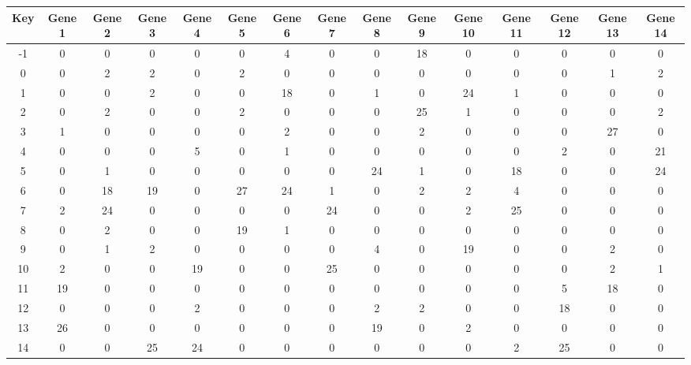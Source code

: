 \begin{tabular}{|c|c|c|c|c|c|c|c|c|c|c|c|c|c|c|}
\hline
Key & Gene 1 & Gene 2 & Gene 3 & Gene 4 & Gene 5 & Gene 6 & Gene 7 & Gene 8 & Gene 9 & Gene 10 & Gene 11 & Gene 12 & Gene 13 & Gene 14 \\
\hline
-1 & 0 & 0 & 0 & 0 & 0 & 4 & 0 & 0 & 18 & 0 & 0 & 0 & 0 & 0 \\
0 & 0 & 2 & 2 & 0 & 2 & 0 & 0 & 0 & 0 & 0 & 0 & 0 & 1 & 2 \\
1 & 0 & 0 & 2 & 0 & 0 & 18 & 0 & 1 & 0 & 24 & 1 & 0 & 0 & 0 \\
2 & 0 & 2 & 0 & 0 & 2 & 0 & 0 & 0 & 25 & 1 & 0 & 0 & 0 & 2 \\
3 & 1 & 0 & 0 & 0 & 0 & 2 & 0 & 0 & 2 & 0 & 0 & 0 & 27 & 0 \\
4 & 0 & 0 & 0 & 5 & 0 & 1 & 0 & 0 & 0 & 0 & 0 & 2 & 0 & 21 \\
5 & 0 & 1 & 0 & 0 & 0 & 0 & 0 & 24 & 1 & 0 & 18 & 0 & 0 & 24 \\
6 & 0 & 18 & 19 & 0 & 27 & 24 & 1 & 0 & 2 & 2 & 4 & 0 & 0 & 0 \\
7 & 2 & 24 & 0 & 0 & 0 & 0 & 24 & 0 & 0 & 2 & 25 & 0 & 0 & 0 \\
8 & 0 & 2 & 0 & 0 & 19 & 1 & 0 & 0 & 0 & 0 & 0 & 0 & 0 & 0 \\
9 & 0 & 1 & 2 & 0 & 0 & 0 & 0 & 4 & 0 & 19 & 0 & 0 & 2 & 0 \\
10 & 2 & 0 & 0 & 19 & 0 & 0 & 25 & 0 & 0 & 0 & 0 & 0 & 2 & 1 \\
11 & 19 & 0 & 0 & 0 & 0 & 0 & 0 & 0 & 0 & 0 & 0 & 5 & 18 & 0 \\
12 & 0 & 0 & 0 & 2 & 0 & 0 & 0 & 2 & 2 & 0 & 0 & 18 & 0 & 0 \\
13 & 26 & 0 & 0 & 0 & 0 & 0 & 0 & 19 & 0 & 2 & 0 & 0 & 0 & 0 \\
14 & 0 & 0 & 25 & 24 & 0 & 0 & 0 & 0 & 0 & 0 & 2 & 25 & 0 & 0 \\
\hline
\end{tabular}